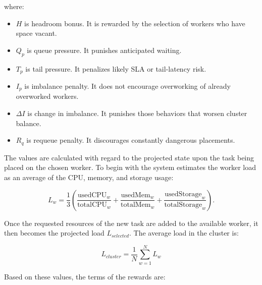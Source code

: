 where:

\begin{itemize}
    \item \(H\) is headroom bonus. It is rewarded by the selection of workers who have space vacant.
    \item \(Q_p\) is queue pressure. It punishes anticipated waiting.
    \item \(T_p\) is tail pressure. It penalizes likely SLA or tail-latency risk.
    \item \(I_p\) is imbalance penalty. It does not encourage overworking of already overworked workers.
    \item \(\Delta I\) is change in imbalance. It punishes those behaviors that worsen cluster balance.
    \item \(R_q\) is requeue penalty. It discourages constantly dangerous placements.
\end{itemize}

The values are calculated with regard to the projected state upon the task being placed on the chosen worker. To begin with the system estimates the worker load as an average of the CPU, memory, and storage usage:

\[
L_w = \frac{1}{3}\left(\frac{\text{usedCPU}_w}{\text{totalCPU}_w} + \frac{\text{usedMem}_w}{\text{totalMem}_w} + \frac{\text{usedStorage}_w}{\text{totalStorage}_w}\right).
\]

Once the requested resources of the new task are added to the available worker, it then becomes the projected load \(L_{selected}\). The average load in the cluster is:

\[
L_{cluster} = \frac{1}{N}\sum_{w=1}^{N} L_w
\]

Based on these values, the terms of the rewards are:

